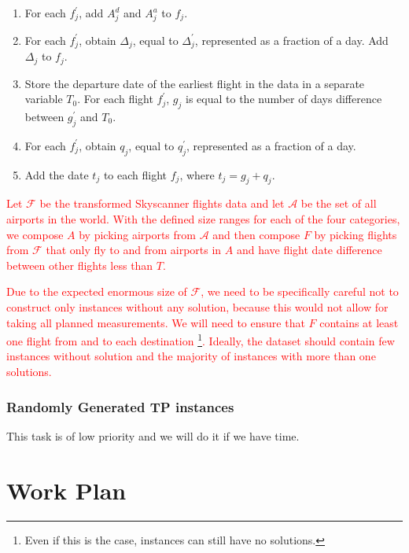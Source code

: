 \documentclass{mprop}
\theoremstyle{definition}
\begin{document}
\begin{enumerate}
\color{red}
\item For each $f^{\prime}_{j}$, add $A^{d}_{j}$ and $A^{a}_{j}$ to $f_{j}$.
\item For each $f^{\prime}_{j}$, obtain $\Delta_{j}$, equal to $\Delta^{\prime}_{j}$, represented as a fraction of a day. Add $\Delta_{j}$ to $f_{j}$.
\item %
Store the departure date of the earliest flight in the data in a separate variable $T_{0}$. For each flight $f^{\prime}_{j}$, $g_{j}$ is equal to the number of days difference between $g^{\prime}_{j}$ and $T_{0}$.
\item For each $f^{\prime}_{j}$, obtain $q_{j}$, equal to $q^{\prime}_{j}$, represented as a fraction of a day.
\item Add the date $t_{j}$ to each flight $f_{j}$, where $t_{j} = g_{j} + q_{j}$.
\end{enumerate}

\textcolor{red}{
Let $\mathcal{F}$ be the transformed Skyscanner flights data and let $\mathcal{A}$ be the set of all airports in the world. With the defined size ranges for each of the four categories, we compose $A$ by picking airports from $\mathcal{A}$ and then compose $F$ by picking flights from $\mathcal{F}$ that only fly to and from airports in $A$ and have flight date difference between other flights less than $T$.}

\textcolor{red}{
Due to the expected enormous size of $\mathcal{F}$, we need to be specifically careful not to construct only instances without any solution, because this would not allow for taking all planned measurements. We will need to ensure that $F$ contains at least one flight from and to each destination \footnote{Even if this is the case, instances can still have no solutions.}. Ideally, the dataset should contain few instances without solution and the majority of instances with more than one solutions.}

\subsubsection*{Randomly Generated TP instances}

This task is of low priority and we will do it if we have time.

\section{Work Plan}
\label{sec:workplan}
\end{document}
